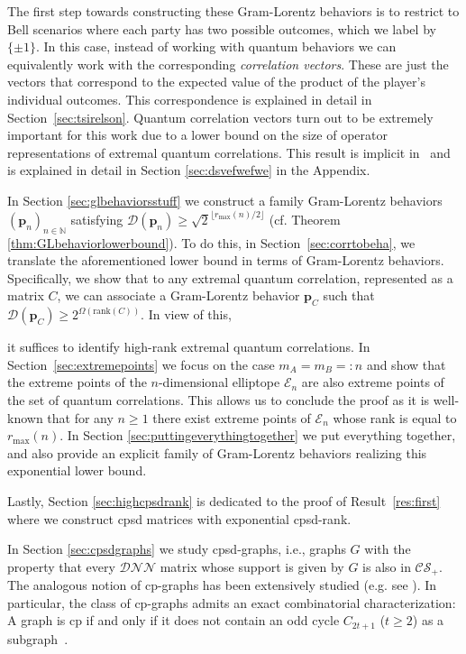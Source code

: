 \documentclass{siamart}
\begin{document}
{{{The first step towards constructing these Gram-Lorentz behaviors is  to  restrict to Bell scenarios where each party  has two possible outcomes, which we label by $\{\pm 1\}$. In this  case, instead of working with quantum  behaviors 
we can equivalently work with the corresponding {\em correlation vectors}.  These are just the vectors that  correspond to the expected value  of the product of the player's individual outcomes.
This correspondence is  explained  in detail in Section~\ref{sec:tsirelson}.
Quantum correlation vectors   turn out to be extremely important  for this work  due to a  lower bound  on the size of  operator representations of extremal quantum correlations. This  result is implicit in~\cite{TS87} and  is explained in detail in Section \ref{sec:dsvefwefwe} in the Appendix.

In Section \ref{sec:glbehaviorsstuff} we construct  a family   Gram-Lorentz behaviors  $({\mathbf{p}}_n)_{n\in \mathbb{N}}$ satisfying  $\mathcal{D}({\mathbf{p}}_n)\ge  {\sqrt{2}^{\lfloor {r_{\max}}(n)/ 2 \rfloor}}$ (cf.   Theorem \ref{thm:GLbehaviorlowerbound}). To do this,
in Section~\ref{sec:corrtobeha},   we  translate the aforementioned lower bound  in  terms of  Gram-Lorentz behaviors.  Specifically, we show that to any extremal quantum correlation, {represented as a matrix $C$,} we can associate a Gram-Lorentz behavior ${\mathbf{p}}_C$  such that $\mathcal{D}({\mathbf{p}}_C)\ge 2^{\Omega({\mathrm{rank}}(C))}$.
  In view of this,
  
  it suffices to identify high-rank extremal quantum correlations. In Section~\ref{sec:extremepoints} we focus on the case $m_A=m_B=:n$ and show that the extreme points of the  $n$-dimensional elliptope ${\mathcal{E}}_n$  are also  extreme points of the set of quantum correlations.
  This allows {us} to conclude the proof as it  is well-known that for any $n\ge1 $ there exist extreme points of ${\mathcal{E}}_n$ whose rank is equal to ${r_{\max}}(n)$.
   In Section \ref{sec:puttingeverythingtogether} we put everything  together,
   and also  provide  an explicit family of Gram-Lorentz behaviors realizing this exponential lower bound. {Lastly, Section \ref{sec:highcpsdrank} is dedicated to the  proof of Result~\ref{res:first} where we  construct cpsd matrices with exponential  cpsd-rank.

In  Section \ref{sec:cpsdgraphs}   we study  cpsd-graphs, i.e., graphs $G$ with the property that every ${\mathcal{DNN}}$ matrix whose support is given by $G$ is also {in} ${\mathcal{CS}_+}$.   The analogous notion of cp-graphs has been  extensively studied (e.g. see \cite[Section~2.5]{CP}).
In particular, the class of cp-graphs admits an exact combinatorial characterization: A graph is cp  if and only if  it does not contain an odd cycle $C_{2t+1}$ ($t\ge 2$)  as a subgraph~\cite{KB}.

}}}}
\end{document}
